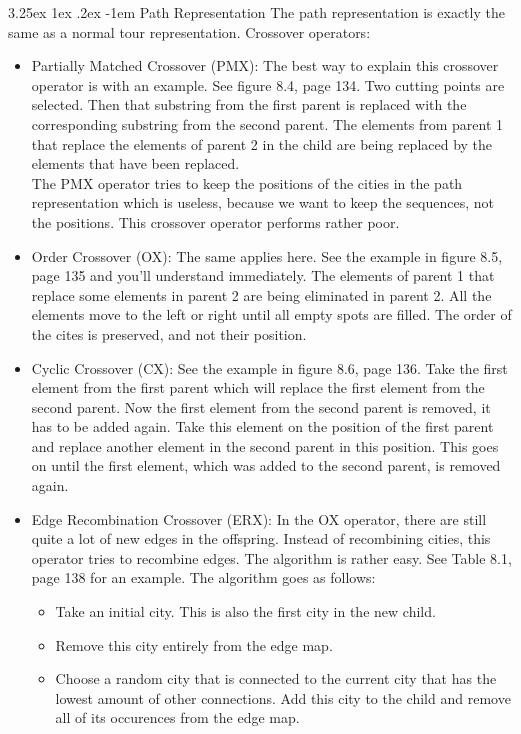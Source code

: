 \documentclass[12pt]{article}
\makeatletter
\renewcommand\paragraph{\@startsection{paragraph}{5}{\z@}%
  {3.25ex \@plus1ex \@minus.2ex}%
  {-1em}%
  {\normalfont\normalsize\bfseries}}
\makeatother
\begin{document}
\paragraph{Path Representation}
The path representation is exactly the same as a normal tour representation. Crossover operators:
\begin{itemize}
\item Partially Matched Crossover (PMX): The best way to explain this crossover operator is with an example. See figure 8.4, page 134. Two cutting points are selected. Then that substring from the first parent is replaced with the corresponding substring from the second parent. The elements from parent 1 that replace the elements of parent 2 in the child are being replaced by the elements that have been replaced.\\
The PMX operator tries to keep the positions of the cities in the path representation which is useless, because we want to keep the sequences, not the positions. This crossover operator performs rather poor.
\item Order Crossover (OX): The same applies here. See the example in figure 8.5, page 135 and you'll understand immediately. The elements of parent 1 that replace some elements in parent 2 are being eliminated in parent 2. All the elements move to the left or right until all empty spots are filled. The order of the cites is preserved, and not their position.
\item Cyclic Crossover (CX): See the example in figure 8.6, page 136. Take the first element from the first parent which will replace the first element from the second parent. Now the first element from the second parent is removed, it has to be added again. Take this element on the position of the first parent and replace another element in the second parent in this position. This goes on until the first element, which was added to the second parent, is removed again.
\item Edge Recombination Crossover (ERX): In the OX operator, there are still quite a lot of new edges in the offspring. Instead of recombining cities, this operator tries to recombine edges. The algorithm is rather easy. See Table 8.1, page 138 for an example. The algorithm goes as follows:
\begin{itemize}
\item Take an initial city. This is also the first city in the new child.
\item Remove this city entirely from the edge map.
\item Choose a random city that is connected to the current city that has the lowest amount of other connections. Add this city to the child and remove all of its occurences from the edge map.

\end{itemize}
\end{itemize}
\end{document}
